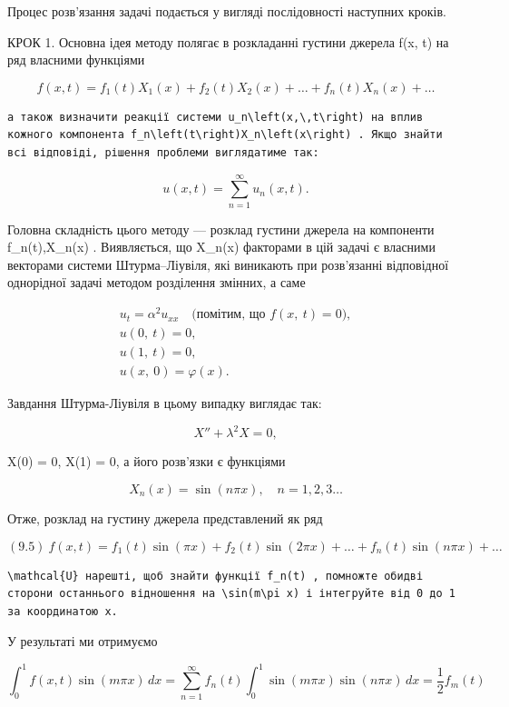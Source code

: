 \documentclass[
  ukrainian,
]{article}
\begin{document}
Процес розв'язання задачі подається у вигляді послідовності наступних
кроків.

КРОК 1. Основна ідея методу полягає в розкладанні густини джерела f(x,
t) на ряд власними функціями

\[
f(x, t) = f_1(t) X_1(x) + f_2(t) X_2(x) + \dots + f_n(t) X_n(x) + \dots
\]

\begin{verbatim}
а також визначити реакції системи u_n\left(x,\,t\right) на вплив кожного компонента f_n\left(t\right)X_n\left(x\right) . Якщо знайти всі відповіді, рішення проблеми виглядатиме так:
\end{verbatim}

\[
u(x, t) = \sum_{n=1}^{\infty} u_n(x, t).
\]

Головна складність цього методу --- розклад густини джерела на
компоненти f\_n(t),X\_n(x) . Виявляється, що X\_n(x) факторами в цій
задачі є власними векторами системи Штурма--Ліувіля, які виникають при
розв'язанні відповідної однорідної задачі методом розділення змінних, а
саме

\[
\begin{array}{c} u_t = \alpha^2 u_{xx} \quad \text{(помітим, що } f(x, \ t) = 0), \\ u(0, \ t) = 0, \\ u(1, \ t) = 0, \\ u(x, \ 0) = \varphi(x). \end{array}
\]

Завдання Штурма-Ліувіля в цьому випадку виглядає так:

\[
X'' + \lambda^2 X = 0,
\]

X(0) = 0, X(1) = 0, а його розв'язки є функціями

\[
X_n(x) = \sin(n\pi x), \quad n = 1, 2, 3 \dots
\]

Отже, розклад на густину джерела представлений як ряд

\[
(9.5) \ f(x,t) = f_1(t) \sin(\pi x) + f_2(t) \sin(2\pi x) + \dots + f_n(t) \sin(n\pi x) + \dots
\]

\begin{verbatim}
\mathcal{U} нарешті, щоб знайти функції f_n(t) , помножте обидві сторони останнього відношення на \sin(m\pi x) і інтегруйте від 0 до 1 за координатою x.
\end{verbatim}

У результаті ми отримуємо

\[
\int_{0}^{1} f(x, t) \sin(m\pi x)\,dx = \sum_{n=1}^{\infty} f_{n}(t) \int_{0}^{1} \sin(m\pi x) \sin(n\pi x)\,dx = \frac{1}{2} f_{m}(t)
\]
\end{document}
